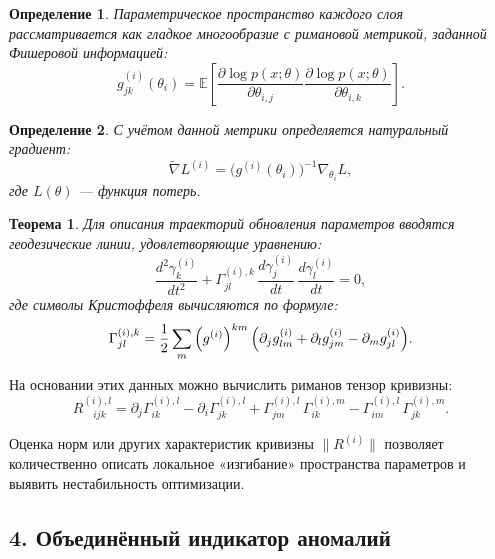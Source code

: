 \documentclass[a4paper,12pt]{article}
\newtheorem{theorem}{Теорема}
\newtheorem{definition}{Определение}
\begin{document}
\begin{definition}
Параметрическое пространство каждого слоя рассматривается как гладкое многообразие с римановой метрикой, заданной Фишеровой информацией:
\begin{equation}
    g^{(i)}_{jk}(\theta_i) = \mathbb{E}\left[\frac{\partial \log p(x;\theta)}{\partial \theta_{i,j}} \frac{\partial \log p(x;\theta)}{\partial \theta_{i,k}}\right].
\end{equation}
\end{definition}

\begin{definition}
С учётом данной метрики определяется \emph{натуральный градиент}:
\begin{equation}
    \tilde{\nabla} L^{(i)} = \bigl(g^{(i)}(\theta_i)\bigr)^{-1}\nabla_{\theta_i} L,
\end{equation}
где \( L(\theta) \) --- функция потерь.
\end{definition}

\begin{theorem}
Для описания траекторий обновления параметров вводятся геодезические линии, удовлетворяющие уравнению:
\begin{equation}
    \frac{d^2\gamma^{(i)}_k}{dt^2} + \Gamma^{(i),k}_{jl}\,\frac{d\gamma^{(i)}_j}{dt}\,\frac{d\gamma^{(i)}_l}{dt} = 0,
\end{equation}
где символы Кристоффеля вычисляются по формуле:
\begin{equation}
    \Gamma^{(i),k}_{jl} = \frac{1}{2}\sum_{m}\left(g^{(i)}\right)^{km}\Bigl(\partial_j g^{(i)}_{lm} + \partial_l g^{(i)}_{jm} - \partial_m g^{(i)}_{jl}\Bigr).
\end{equation}
\end{theorem}

На основании этих данных можно вычислить риманов тензор кривизны:
\begin{equation}
    R^{(i),l}_{\quad ijk} = \partial_j \Gamma^{(i),l}_{ik} - \partial_i \Gamma^{(i),l}_{jk} + \Gamma^{(i),l}_{jm}\,\Gamma^{(i),m}_{ik} - \Gamma^{(i),l}_{im}\,\Gamma^{(i),m}_{jk}.
\end{equation}

Оценка норм или других характеристик кривизны \(\|R^{(i)}\|\) позволяет количественно описать локальное «изгибание» пространства параметров и выявить нестабильность оптимизации.

\subsection*{4. Объединённый индикатор аномалий}
\end{document}
